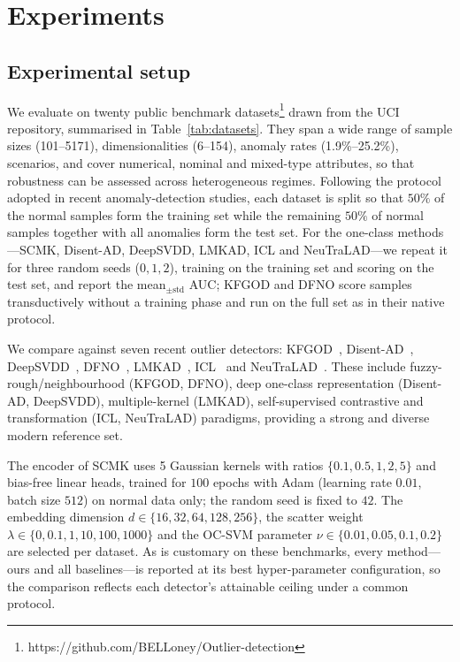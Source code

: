 \documentclass[times, review, 10pt]{elsarticle}
\begin{document}
\section{Experiments}
\label{sec:exp}

\subsection{Experimental setup}
\label{subsec:exp-setup}

We evaluate on twenty public benchmark datasets\footnote{https://github.com/BELLoney/Outlier-detection} drawn from the UCI
repository, summarised in Table~\ref{tab:datasets}. They span a wide range of
sample sizes (101--5171), dimensionalities (6--154), anomaly rates
(1.9\%--25.2\%), scenarios, and cover numerical, nominal and mixed-type attributes, so that
robustness can be assessed across heterogeneous regimes. Following the
protocol adopted in recent anomaly-detection studies,
each dataset is split so that $50\%$ of the normal samples form the training set
while the remaining $50\%$ of normal samples together with all anomalies form the
test set. For the one-class methods---SCMK, Disent-AD, DeepSVDD, LMKAD, ICL and NeuTraLAD---we repeat it for three
random seeds ($0,1,2$), training on the training set and scoring on the test
set, and report the mean$_{\pm\text{std}}$ AUC; KFGOD and DFNO score samples transductively without a training
phase and run on the full set as in their native protocol.

We compare against seven recent outlier detectors: KFGOD~\cite{kfgod2024},
Disent-AD~\cite{disentad2025}, DeepSVDD~\cite{deepsvdd2018}, DFNO~\cite{dfno2024},
LMKAD~\cite{lmkad}, ICL~\cite{icl2022} and NeuTraLAD~\cite{neutralad2021}.
These include fuzzy-rough/neighbourhood (KFGOD, DFNO), deep one-class representation
(Disent-AD, DeepSVDD), multiple-kernel (LMKAD), self-supervised
contrastive and transformation (ICL, NeuTraLAD) paradigms, providing a strong and
diverse modern reference set.

The encoder of SCMK uses 5 Gaussian kernels with ratios $\{0.1,0.5,1,2,5\}$ and
bias-free linear heads, trained for $100$ epochs with Adam (learning rate
$0.01$, batch size $512$) on normal data only; the random seed is fixed to $42$.
The embedding dimension $d\!\in\!\{16,32,64,128,256\}$, the scatter weight
$\lambda\!\in\!\{0,0.1,1,10,100,1000\}$ and the OC-SVM parameter
$\nu\!\in\!\{0.01,0.05,0.1,0.2\}$ are selected per dataset. As is customary on
these benchmarks, every method---ours and all baselines---is reported at its best
hyper-parameter configuration, so the comparison reflects each detector's
attainable ceiling under a common protocol.
\end{document}
